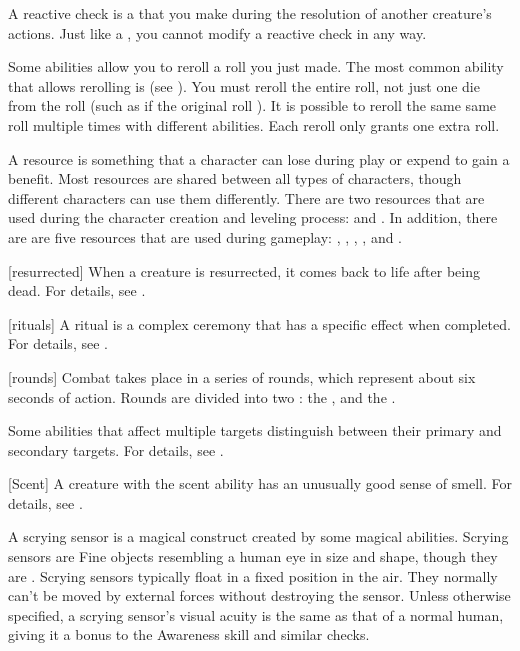  A reactive check is a  that you make during the resolution of another creature's actions.
Just like a , you cannot modify a reactive check in any way.

 Some abilities allow you to reroll a roll you just made.
The most common ability that allows rerolling is  (see ).
You must reroll the entire roll, not just one die from the roll (such as if the original roll ).
It is possible to reroll the same same roll multiple times with different abilities.
Each reroll only grants one extra roll.

 A resource is something that a character can lose during play or expend to gain a benefit.
Most resources are shared between all types of characters, though different characters can use them differently.
There are two resources that are used during the character creation and leveling process:  and .
In addition, there are are five resources that are used during gameplay: , , , , and .

[resurrected] When a creature is resurrected, it comes back to life after being dead.
For details, see .

[rituals] A ritual is a complex \magical ceremony that has a specific effect when completed.
For details, see .

[rounds] Combat takes place in a series of rounds, which represent about six seconds of action.
Rounds are divided into two : the , and the .

 Some abilities that affect multiple targets distinguish between their primary and secondary targets.
For details, see .

[Scent] A creature with the scent ability has an unusually good sense of smell.
For details, see .

 A scrying sensor is a magical construct created by some magical abilities.
Scrying sensors are Fine objects resembling a human eye in size and shape, though they are .
Scrying sensors typically float in a fixed position in the air.
They normally can't be moved by external forces without destroying the sensor.
Unless otherwise specified, a scrying sensor's visual acuity is the same as that of a normal human, giving it a  bonus to the Awareness skill and similar checks.

